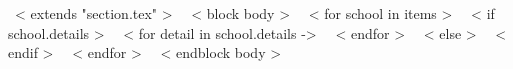 ~< extends "section.tex" >~
~< block body >~
~< for school in items >~
	~< if school.details >~
   		 ~< for detail in school.details ->~
    		~< endfor >~
	~< else >~
	~< endif >~
~< endfor >~
~< endblock body >~